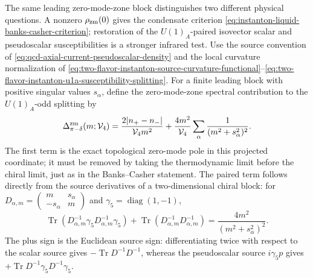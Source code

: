 \begin{controlledapproximation}
\label{ca:instanton-zero-mode-zone-u1a-susceptibility}
The same leading zero-mode-zone block distinguishes two different physical
questions.  A nonzero \(\rho_{\rm zm}(0)\) gives the condensate criterion
\eqref{eq:instanton-liquid-banks-casher-criterion}; restoration of the
\(U(1)_A\)-paired isovector scalar and pseudoscalar susceptibilities is a
stronger infrared test.  Use the source convention of
\eqref{eq:qcd-axial-current-pseudoscalar-density} and the local curvature
normalization of
\eqref{eq:two-flavor-instanton-source-curvature-functional}--\eqref{eq:two-flavor-instanton-u1a-susceptibility-splitting}.
For a finite leading block with positive singular values \(s_\alpha\), define
the zero-mode-zone spectral contribution to the \(U(1)_A\)-odd splitting by
\begin{equation}
  \Delta_{\pi-\delta}^{\rm zm}(m;\mathcal V_4)
  =
  \frac{2|n_+-n_-|}{\mathcal V_4m^2}
  +
  \frac{4m^2}{\mathcal V_4}
  \sum_{\alpha}
  \frac1{(m^2+s_\alpha^2)^2}.
  \label{eq:instanton-zero-mode-zone-u1a-finite}
\end{equation}
The first term is the exact topological zero-mode pole in this projected
coordinate; it must be removed by taking the thermodynamic limit before the
chiral limit, just as in the Banks--Casher statement.  The paired term follows
directly from the source derivatives of a two-dimensional chiral block:
for \(D_{\alpha,m}=\left(\begin{smallmatrix}m&s_\alpha\\
-s_\alpha&m\end{smallmatrix}\right)\) and
\(\gamma_5=\operatorname{diag}(1,-1)\),
\[
  \operatorname{Tr}(D_{\alpha,m}^{-1}\gamma_5D_{\alpha,m}^{-1}\gamma_5)
  +
  \operatorname{Tr}(D_{\alpha,m}^{-1}D_{\alpha,m}^{-1})
  =
  \frac{4m^2}{(m^2+s_\alpha^2)^2}.
\]
The plus sign is the Euclidean source sign: differentiating twice with respect
to the scalar source gives \(-\operatorname{Tr}D^{-1}D^{-1}\), whereas the
pseudoscalar source \(i\gamma_5p\) gives
\(+\operatorname{Tr}D^{-1}\gamma_5D^{-1}\gamma_5\).


\end{controlledapproximation}

